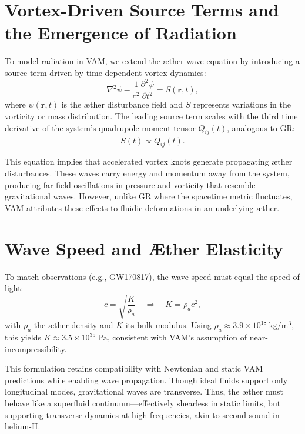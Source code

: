 
\section*{Vortex-Driven Source Terms and the Emergence of Radiation}

To model radiation in VAM, we extend the æther wave equation by introducing a source term driven by time-dependent vortex dynamics:
\begin{equation}
\nabla^2 \psi - \frac{1}{c^2} \frac{\partial^2 \psi}{\partial t^2} = S(\mathbf{r}, t),
\end{equation}
where $\psi(\mathbf{r}, t)$ is the æther disturbance field and $S$ represents variations in the vorticity or mass distribution. The leading source term scales with the third time derivative of the system's quadrupole moment tensor $Q_{ij}(t)$, analogous to GR:
\begin{equation}
S(t) \propto \dddot{Q}_{ij}(t).
\end{equation}

This equation implies that accelerated vortex knots generate propagating æther disturbances. These waves carry energy and momentum away from the system, producing far-field oscillations in pressure and vorticity that resemble gravitational waves. However, unlike GR where the spacetime metric fluctuates, VAM attributes these effects to fluidic deformations in an underlying æther.

\section*{Wave Speed and Æther Elasticity}

To match observations (e.g., GW170817), the wave speed must equal the speed of light:
\begin{equation}
c = \sqrt{\frac{K}{\rho_a}} \quad \Rightarrow \quad K = \rho_a c^2,
\end{equation}
with $\rho_a$ the æther density and $K$ its bulk modulus. Using $\rho_a \approx 3.9 \times 10^{18}~\mathrm{kg/m^3}$, this yields $K \approx 3.5 \times 10^{35}~\mathrm{Pa}$, consistent with VAM's assumption of near-incompressibility.

This formulation retains compatibility with Newtonian and static VAM predictions while enabling wave propagation. Though ideal fluids support only longitudinal modes, gravitational waves are transverse. Thus, the æther must behave like a superfluid continuum—effectively shearless in static limits, but supporting transverse dynamics at high frequencies, akin to second sound in helium-II.


